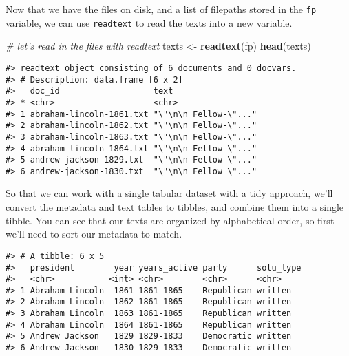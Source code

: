 \documentclass[]{book}
\newenvironment{Shaded}{\begin{snugshade}}{\end{snugshade}}
\newcommand{\CommentTok}[1]{\textcolor[rgb]{0.56,0.35,0.01}{\textit{#1}}}
\newcommand{\KeywordTok}[1]{\textcolor[rgb]{0.13,0.29,0.53}{\textbf{#1}}}
\newcommand{\NormalTok}[1]{#1}
\newcommand{\OperatorTok}[1]{\textcolor[rgb]{0.81,0.36,0.00}{\textbf{#1}}}
\newcommand{\StringTok}[1]{\textcolor[rgb]{0.31,0.60,0.02}{#1}}
\begin{document}
Now that we have the files on disk, and a list of filepaths stored in the \texttt{fp} variable, we can use \texttt{readtext} to read the texts into a new variable.

\begin{Shaded}
\begin{Highlighting}[]
\CommentTok{# let's read in the files with readtext}
\NormalTok{texts <-}\StringTok{ }\KeywordTok{readtext}\NormalTok{(fp)}
\KeywordTok{head}\NormalTok{(texts)}
\end{Highlighting}
\end{Shaded}

\begin{verbatim}
#> readtext object consisting of 6 documents and 0 docvars.
#> # Description: data.frame [6 x 2]
#>   doc_id                   text                 
#> * <chr>                    <chr>                
#> 1 abraham-lincoln-1861.txt "\"\n\n Fellow-\"..."
#> 2 abraham-lincoln-1862.txt "\"\n\n Fellow-\"..."
#> 3 abraham-lincoln-1863.txt "\"\n\n Fellow-\"..."
#> 4 abraham-lincoln-1864.txt "\"\n\n Fellow-\"..."
#> 5 andrew-jackson-1829.txt  "\"\n\n Fellow \"..."
#> 6 andrew-jackson-1830.txt  "\"\n\n Fellow \"..."
\end{verbatim}

So that we can work with a single tabular dataset with a tidy approach, we'll convert the metadata and text tables to tibbles, and combine them into a single tibble. You can see that our texts are organized by alphabetical order, so first we'll need to sort our metadata to match.

\begin{Shaded}
\end{Shaded}

\begin{verbatim}
#> # A tibble: 6 x 5
#>   president        year years_active party      sotu_type
#>   <chr>           <int> <chr>        <chr>      <chr>    
#> 1 Abraham Lincoln  1861 1861-1865    Republican written  
#> 2 Abraham Lincoln  1862 1861-1865    Republican written  
#> 3 Abraham Lincoln  1863 1861-1865    Republican written  
#> 4 Abraham Lincoln  1864 1861-1865    Republican written  
#> 5 Andrew Jackson   1829 1829-1833    Democratic written  
#> 6 Andrew Jackson   1830 1829-1833    Democratic written
\end{verbatim}
\end{document}
